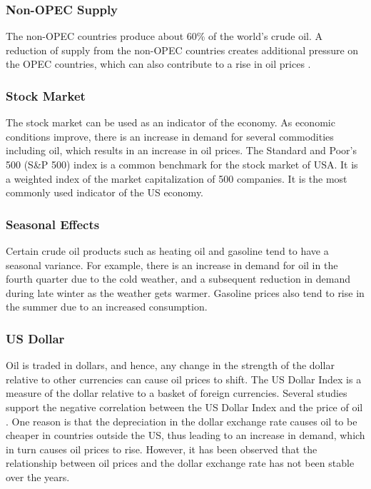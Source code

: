 \documentclass[runningheads]{llncs}
\begin{document}
\subsubsection{Non-OPEC Supply}
The non-OPEC countries produce about 60\% of the world's crude oil. A reduction of supply from the non-OPEC countries creates additional pressure on the OPEC countries, which can also contribute to a rise in oil prices \cite{eiafactors}.

\subsubsection{Stock Market}
The stock market can be used as an indicator of the economy. As economic conditions improve, there is an increase in demand for several commodities including oil, which results in an increase in oil prices. The Standard and Poor's 500 (S\&P 500) index is a common benchmark for the stock market of USA. It is a weighted index of the market capitalization of 500 companies. It is the most commonly used indicator of the US economy.

\subsubsection{Seasonal Effects}
Certain crude oil products such as heating oil and gasoline tend to have a seasonal variance. For example, there is an increase in demand for oil in the fourth quarter due to the cold weather, and a subsequent reduction in demand during late winter as the weather gets warmer. Gasoline prices also tend to rise in the summer due to an increased consumption. 

\subsubsection{US Dollar}
Oil is traded in dollars, and hence, any change in the strength of the dollar relative to other currencies can cause oil prices to shift. The US Dollar Index is a measure of the dollar relative to a basket of foreign currencies. Several studies support the negative correlation between the US Dollar Index and the price of oil \cite{eiafactors} \cite{oildollar}. One reason is that the depreciation in the dollar exchange rate causes oil to be cheaper in countries outside the US, thus leading to an increase in demand, which in turn causes oil prices to rise. However, it has been observed that the relationship between oil prices and the dollar exchange rate has not been stable over the years.
\end{document}
